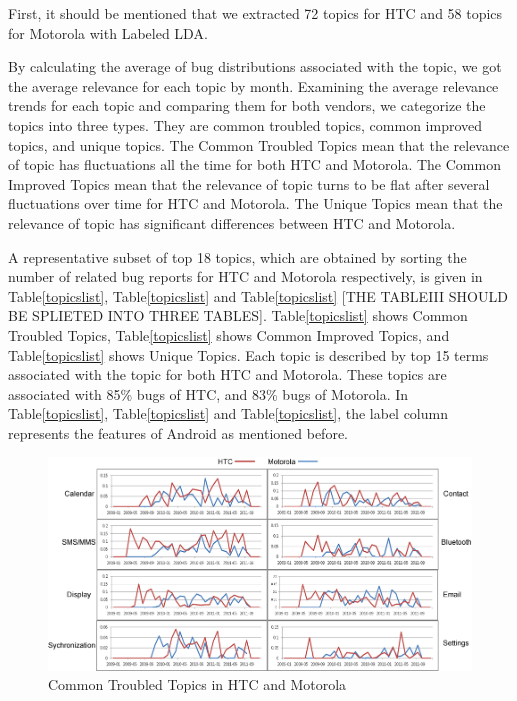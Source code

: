 \documentclass[10pt, conference, compsocconf]{IEEEtran}
\begin{document}
First, it should be mentioned that we extracted 72 topics for HTC and 58 topics for Motorola with Labeled LDA.

By calculating the average of bug distributions associated with the topic, we got the average relevance for each topic by month. Examining the average relevance trends for each topic and comparing them for both vendors, we categorize the topics into three types. They are common troubled topics, common improved topics, and unique topics. The Common Troubled Topics mean that the relevance of topic has fluctuations all the time for both HTC and Motorola. The Common Improved Topics mean that the relevance of topic turns to be flat after several fluctuations over time for HTC and Motorola. The Unique Topics mean that the relevance of topic has significant differences between HTC and Motorola.

A representative subset of top 18 topics, which are obtained by sorting the number of related bug reports for HTC and Motorola respectively, is given in Table\ref{topicslist}, Table\ref{topicslist} and Table\ref{topicslist} [THE TABLEIII SHOULD BE SPLIETED INTO THREE TABLES]. Table\ref{topicslist} shows Common Troubled Topics, Table\ref{topicslist} shows Common Improved Topics, and Table\ref{topicslist} shows Unique Topics. Each topic is described by top 15 terms associated with the topic for both HTC and Motorola. These topics are associated with 85\% bugs of HTC, and 83\% bugs of Motorola. In Table\ref{topicslist}, Table\ref{topicslist} and Table\ref{topicslist}, the label column represents the features of Android as mentioned before.

\begin{figure}[htb]
\centering
\includegraphics[width=1\textwidth]{commontopic.png}
\caption{Common Troubled Topics in HTC and Motorola}
\label{commontopic}
\end{figure}
\end{document}
